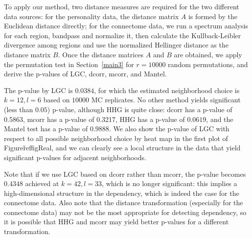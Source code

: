\documentclass[11pt]{article}
\begin{document}
To apply our method, two distance measures are required for the two different data sources: for the personality data, the distance matrix $A$ is formed by the Euclidean distance directly; for the connectome data, we run a spectrum analysis for each region, bandpass and normalize it, then calculate the Kullback-Leibler divergence among regions and use the normalized Hellinger distance as the distance matrix $B$. Once the distance matrices $A$ and $B$ are obtained, we apply the permutation test in Section~\ref{main3} for $r=10000$ random permutations, and derive the p-values of LGC, dcorr, mcorr, and Mantel. 

The p-value by LGC is $0.0384$, for which the estimated neighborhood choice is $k=12, l=6$ based on $10000$ MC replicates. No other method yields significant (less than $0.05$) p-value, although HHG is quite close: dcorr has a p-value of 0.5863, mcorr has a p-value of 0.3217, HHG has a p-value of $0.0619$, and the Mantel test has a p-value of $0.9888$. We also show the p-value of LGC with respect to all possible neighborhood choice by heat map in the first plot of Figure\~ref{figReal}, and we can clearly see a local structure in the data that yield significant p-values for adjacent neighborhoods.

Note that if we use LGC based on dcorr rather than mcorr, the p-value becomes $0.4348$ achieved at $k=42, l=33$, which is no longer significant: this implies a high-dimensional structure in the dependency, which is indeed the case for the connectome data. Also note that the distance transformation (especially for the connectome data) may not be the most appropriate for detecting dependency, so it is possible that HHG and mcorr may yield better p-values for a different transformation. 
\end{document}

